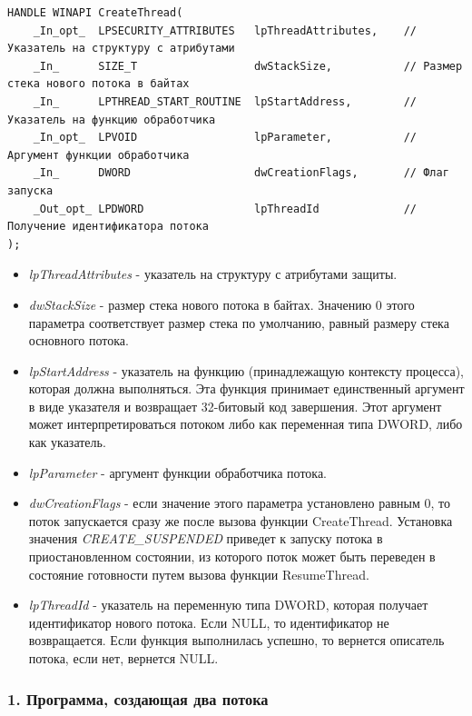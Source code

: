\documentclass[14pt,a4paper,report]{report}
\begin{document}
\begin{verbatim}
HANDLE WINAPI CreateThread(
    _In_opt_  LPSECURITY_ATTRIBUTES   lpThreadAttributes,    // Указатель на структуру с атрибутами
    _In_      SIZE_T                  dwStackSize,           // Размер стека нового потока в байтах
    _In_      LPTHREAD_START_ROUTINE  lpStartAddress,        // Указатель на функцию обработчика
    _In_opt_  LPVOID                  lpParameter,           // Аргумент функции обработчика
    _In_      DWORD                   dwCreationFlags,       // Флаг запуска
    _Out_opt_ LPDWORD                 lpThreadId             // Получение идентификатора потока
);
\end{verbatim}

\begin{itemize}
	\item \emph{lpThreadAttributes} - указатель на структуру с атрибутами защиты.
	\item \emph{dwStackSize} - размер стека нового потока в байтах. Значению 0 этого параметра соответствует размер стека по умолчанию, равный размеру стека основного потока.
	\item \emph{lpStartAddress} - указатель на функцию (принадлежащую контексту процесса), которая должна выполняться. Эта функция принимает единственный аргумент в виде указателя и возвращает 32-битовый код завершения. Этот аргумент может интерпретироваться потоком либо как переменная типа DWORD, либо как указатель.
	\item \emph{lpParameter} - аргумент функции обработчика потока.
	\item \emph{dwCreationFlags} - если значение этого параметра установлено равным 0, то поток запускается сразу же после вызова функции CreateThread. Установка значения \emph{CREATE\_SUSPENDED} приведет к запуску потока в приостановленном состоянии, из которого поток может быть переведен в состояние готовности путем вызова функции ResumeThread.
	\item \emph{lpThreadId} - указатель на переменную типа DWORD, которая получает идентификатор нового потока. Если NULL, то идентификатор не возвращается. Если функция выполнилась успешно, то вернется описатель потока, если нет, вернется NULL.	
\end{itemize}

\subsubsection{1. Программа, создающая два потока}
\end{document}
